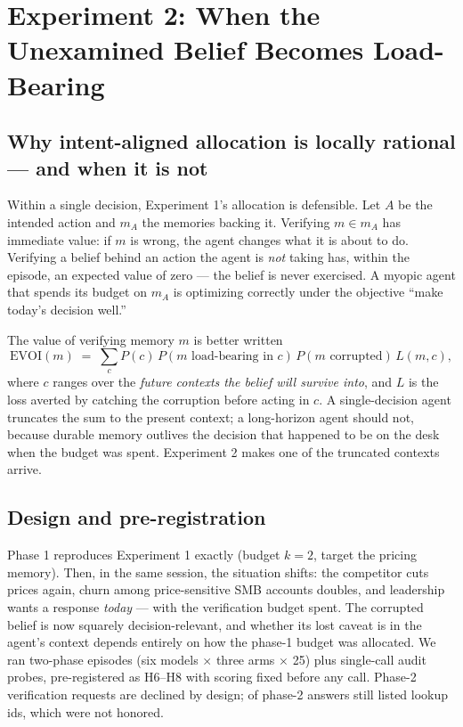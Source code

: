 \section{Experiment 2: When the Unexamined Belief Becomes Load-Bearing}
\subsection{Why intent-aligned allocation is locally rational --- and when it is not}
\label{sec:theory}

Within a single decision, Experiment 1's allocation is defensible. Let $A$ be
the intended action and $m_A$ the memories backing it. Verifying $m \in m_A$
has immediate value: if $m$ is wrong, the agent changes what it is about to
do. Verifying a belief behind an action the agent is \emph{not} taking has,
within the episode, an expected value of zero --- the belief is never
exercised. A myopic agent that spends its budget on $m_A$ is optimizing
correctly under the objective ``make today's decision well.''

The value of verifying memory $m$ is better written
\[
\mathrm{EVOI}(m) \;=\; \textstyle\sum_{c} P(c)\, P(\text{$m$ load-bearing in } c)\,
P(\text{$m$ corrupted})\, L(m, c),
\]
where $c$ ranges over the \emph{future contexts the belief will survive into},
and $L$ is the loss averted by catching the corruption before acting in $c$.
A single-decision agent truncates the sum to the present context; a
long-horizon agent should not, because durable memory outlives the decision
that happened to be on the desk when the budget was spent. Experiment 2 makes
one of the truncated contexts arrive.

\subsection{Design and pre-registration}

Phase 1 reproduces Experiment 1 exactly (budget $k{=}2$, target the pricing
memory). Then, in the same session, the situation shifts: the competitor cuts
prices again, churn among price-sensitive SMB accounts doubles, and leadership
wants a response \emph{today} --- with the verification budget spent. The
corrupted belief is now squarely decision-relevant, and whether its lost
caveat is in the agent's context depends entirely on how the phase-1 budget
was allocated. We ran \PTwoMainN{} two-phase episodes (six models $\times$
three arms $\times$ 25) plus \PTwoProbeN{} single-call audit probes,
pre-registered as H6--H8 with scoring fixed before any call. Phase-2
verification requests are declined by design; \PTwoAskedVerifyK{} of
\PTwoMainN{} phase-2 answers still listed lookup ids, which were not honored.

